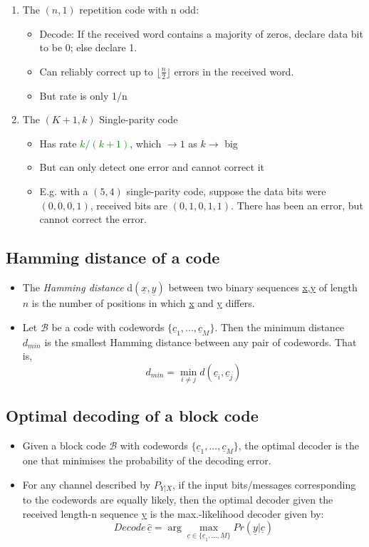 \documentclass[12pt]{article}
\begin{document}
\begin{enumerate}[label=\arabic*)]
    \item The $(n,1)$ repetition code with n odd:
    \begin{itemize}
        \item Decode: If the received word contains a majority of zeros, declare data bit to be 0; else declare 1.
        \item Can reliably correct up to $\lfloor\frac{n}{2}\rfloor$ errors in the received word.
        \item But rate is only 1/n
    \end{itemize}
    \item The $(K+1,k)$ Single-parity code
    \begin{itemize}
        \item Has rate \textcolor{green}{$k/(k+1)$}, which $\rightarrow 1$ as $k\rightarrow$ big
        \item But can only detect one error and cannot correct it
        \item E.g. with a $(5,4)$ single-parity code, suppose the data bits were $(0,0,0,1)$, received bits are $(0,1,0,1,1)$. There has been an error, but cannot correct the error.
    \end{itemize}
\end{enumerate}
\subsection{Hamming distance of a code}
\begin{itemize}
    \item The \textit{Hamming distance} d$(\underline{x},\underline{y})$ between two binary sequences \underline{x},\underline{y} of length $n$ is the number of positions in which \underline{x} and \underline{y} differs.
    \item Let $\mathcal{B}$ be a code with codewords $\{ \underline{c}_1,...,\underline{c}_M\}$. Then the minimum distance $d_{min}$ is the smallest Hamming distance between any pair of codewords. That is,
    \[
    d_{min} = \min_{i\not = j} d(\underline{c}_i,\underline{c}_j)
    \]
\end{itemize}

\subsection{Optimal decoding of a block code}
\begin{itemize}
    \item Given a block code $\mathcal{B}$ with codewords $\{ \underline{c}_1,...,\underline{c}_M\}$, the optimal decoder is the one that minimises the probability of the decoding error.
    \item For any channel described by $P_{Y|X}$, if the input bits/messages corresponding to the codewords are equally likely, then the optimal decoder given the received length-n sequence \underline{y} is the max.-likelihood decoder given by:
    \[
    Decode \, \underline{\hat{c}} = \arg \max_{\underline{c}\in \{\underline{c}_1,...,\underline{M}\}}Pr(\underline{y}|\underline{c})
    \]
\end{itemize}
\end{document}
